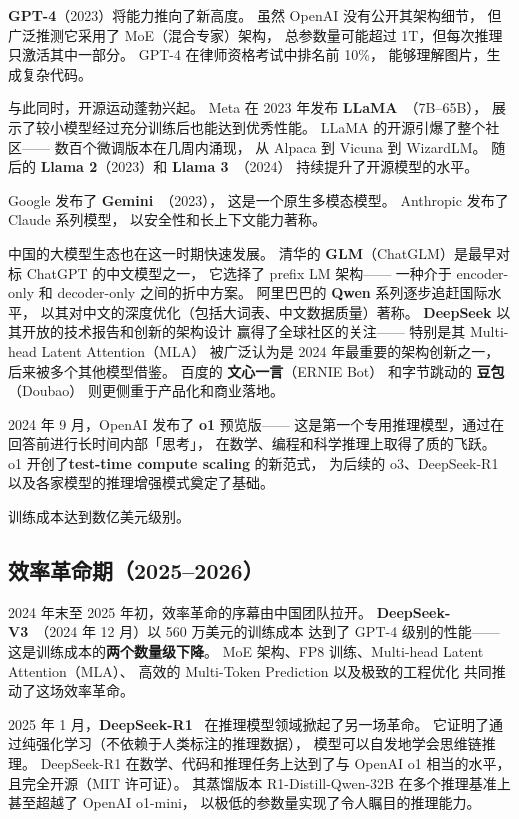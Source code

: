 \textbf{GPT-4}（2023）将能力推向了新高度。
虽然 OpenAI 没有公开其架构细节，
但广泛推测它采用了 MoE（混合专家）架构，
总参数量可能超过 1T，但每次推理只激活其中一部分。
GPT-4 在律师资格考试中排名前 10\%，
能够理解图片，生成复杂代码。

与此同时，开源运动蓬勃兴起。
Meta 在 2023 年发布 \textbf{LLaMA}~\cite{touvron2023llama}（7B--65B），
展示了较小模型经过充分训练后也能达到优秀性能。
LLaMA 的开源引爆了整个社区——
数百个微调版本在几周内涌现，
从 Alpaca 到 Vicuna 到 WizardLM。
随后的 \textbf{Llama 2}（2023）和 \textbf{Llama 3}~\cite{dubey2024llama3}（2024）
持续提升了开源模型的水平。

Google 发布了 \textbf{Gemini}~\cite{anil2023gemini}（2023），
这是一个原生多模态模型。
Anthropic 发布了 Claude 系列模型，
以安全性和长上下文能力著称。

中国的大模型生态也在这一时期快速发展。
清华的 \textbf{GLM}（ChatGLM）是最早对标 ChatGPT 的中文模型之一，
它选择了 prefix LM 架构——
一种介于 encoder-only 和 decoder-only 之间的折中方案。
阿里巴巴的 \textbf{Qwen} 系列逐步追赶国际水平，
以其对中文的深度优化（包括大词表、中文数据质量）著称。
\textbf{DeepSeek} 以其开放的技术报告和创新的架构设计
赢得了全球社区的关注——
特别是其 Multi-head Latent Attention（MLA）
被广泛认为是 2024 年最重要的架构创新之一，
后来被多个其他模型借鉴。
百度的 \textbf{文心一言}（ERNIE Bot）
和字节跳动的 \textbf{豆包}（Doubao）
则更侧重于产品化和商业落地。

2024 年 9 月，OpenAI 发布了 \textbf{o1} 预览版——
这是第一个专用推理模型，通过在回答前进行长时间内部「思考」，
在数学、编程和科学推理上取得了质的飞跃。
o1 开创了\textbf{test-time compute scaling} 的新范式，
为后续的 o3、DeepSeek-R1 以及各家模型的推理增强模式奠定了基础。

训练成本达到数亿美元级别。

\subsection{效率革命期（2025--2026）}

2024 年末至 2025 年初，效率革命的序幕由中国团队拉开。
\textbf{DeepSeek-V3}~\cite{deepseekv3}（2024 年 12 月）以 560 万美元的训练成本
达到了 GPT-4 级别的性能——
这是训练成本的\textbf{两个数量级下降}。
MoE 架构、FP8 训练、Multi-head Latent Attention（MLA）、
高效的 Multi-Token Prediction 以及极致的工程优化
共同推动了这场效率革命。

2025 年 1 月，\textbf{DeepSeek-R1}~\cite{deepseekr1} 在推理模型领域掀起了另一场革命。
它证明了通过纯强化学习（不依赖于人类标注的推理数据），
模型可以自发地学会思维链推理。
DeepSeek-R1 在数学、代码和推理任务上达到了与 OpenAI o1 相当的水平，
且完全开源（MIT 许可证）。
其蒸馏版本 R1-Distill-Qwen-32B 在多个推理基准上
甚至超越了 OpenAI o1-mini，
以极低的参数量实现了令人瞩目的推理能力。

